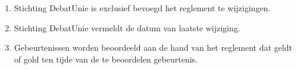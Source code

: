 
\begin{enumerate}
\item Stichting DebatUnie is exclusief bevoegd het reglement te wijzigingen. 
\item Stichting DebatUnie vermeldt de datum van laatste wijziging.
\item Gebeurtenissen worden beoordeeld aan de hand van het reglement dat geldt of gold ten tijde van de te beoordelen gebeurtenis.
\end{enumerate}